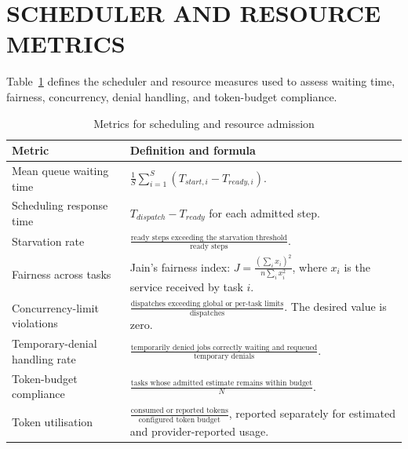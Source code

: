\section{\uppercase{Scheduler and Resource Metrics}}
Table~\ref{tab:scheduler-metrics} defines the scheduler and resource measures used to assess waiting time, fairness, concurrency, denial handling, and token-budget compliance.
\begin{table}[H]
\centering
\caption{Metrics for scheduling and resource admission}
\label{tab:scheduler-metrics}
\begin{tabularx}{\textwidth}{|>{\centering\arraybackslash}p{}|>{\centering\arraybackslash}X|}
\hline
\textbf{Metric} & \textbf{Definition and formula} \\ \hline
Mean queue waiting time & $\frac{1}{S}\sum_{i=1}^{S}(T_{start,i}-T_{ready,i})$. \\ \hline
Scheduling response time & $T_{dispatch}-T_{ready}$ for each admitted step. \\ \hline
Starvation rate & $\frac{\text{ready steps exceeding the starvation threshold}}{\text{ready steps}}$. \\ \hline
Fairness across tasks & Jain's fairness index: $J=\frac{(\sum_i x_i)^2}{n\sum_i x_i^2}$, where $x_i$ is the service received by task $i$. \\ \hline
Concurrency-limit violations & $\frac{\text{dispatches exceeding global or per-task limits}}{\text{dispatches}}$. The desired value is zero. \\ \hline
Temporary-denial handling rate & $\frac{\text{temporarily denied jobs correctly waiting and requeued}}{\text{temporary denials}}$. \\ \hline
Token-budget compliance & $\frac{\text{tasks whose admitted estimate remains within budget}}{N}$. \\ \hline
Token utilisation & $\frac{\text{consumed or reported tokens}}{\text{configured token budget}}$, reported separately for estimated and provider-reported usage. \\ \hline
\end{tabularx}
\end{table}

